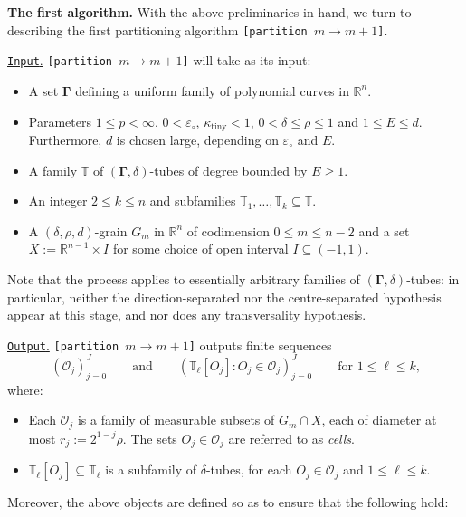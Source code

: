 \documentclass[reqno]{amsart}
\numberwithin{equation}{section}
\newcommand{\R}{\mathbb{R}}
\newcommand{\T}{\mathbb{T}}
\newcommand{\cO}{\mathcal{O}}
\newcommand{\bdGamma}{\boldsymbol{\Gamma}}
\theoremstyle{plain}
\theoremstyle{definition}
\newcommand{\ttiny}{\mathrm{tiny}}
\begin{document}




\noindent\textbf{The first algorithm.} With the above preliminaries in hand, we turn to describing the first partitioning algorithm \texttt{[partition $m \to m+1$]}.\medskip


\noindent\underline{\texttt{Input}.} \texttt{[partition $m \to m+1$]} will take as its input:
\begin{itemize}
     \item A set $\bdGamma$ defining a uniform family of polynomial curves in $\R^n$.
     \item Parameters $1 \leq p < \infty$, $0< \varepsilon_{\circ}$, $\kappa_{\ttiny} < 1$, $0<\delta \leq \rho \leq 1$ and $ 1 \leq E \leq d$. Furthermore, $d$ is chosen large, depending on $\varepsilon_{\circ}$ and $E$. 
    \item A family $\T$ of $(\bdGamma, \delta)$-tubes of degree bounded by $E \geq 1$.  
    \item An integer $2 \leq k \leq n$ and subfamilies $\T_1, \dots, \T_k \subseteq \T$.
    \item A $(\delta, \rho, d)$-grain $G_m$ in $\R^n$ of codimension $0 \leq m \leq n-2$ and a set $X := \R^{n-1} \times I$ for some choice of open interval $I \subseteq (-1,1)$.
\end{itemize}

Note that the process applies to essentially arbitrary families of $(\bdGamma, \delta)$-tubes: in particular, neither the direction-separated nor the centre-separated hypothesis appear at this stage, and nor does any transversality hypothesis.\medskip

%
%
%
\noindent\underline{\texttt{Output}.} \texttt{[partition $m \to m+1$]} outputs finite sequences 
\begin{equation*}
    (\cO_j)_{j=0}^J \qquad \textrm{and} \qquad (\T_{\ell}[O_j] : O_j \in \cO_j)_{j=0}^J \qquad \textrm{for $1 \leq \ell \leq k$,}
\end{equation*}
where:
\begin{itemize}
  \item Each $\cO_j$ is a family of measurable subsets of $G_m \cap X$, each of diameter at most $r_j := 2^{1-j}\rho$. The sets $O_j \in \cO_j$ are referred to as \emph{cells}.
\item $\T_{\ell}[O_j] \subseteq \T_{\ell}$ is a subfamily of $\delta$-tubes, for each $O_j \in \cO_j$ and $1 \leq \ell \leq k$. 
  \end{itemize}
Moreover, the above objects are defined so as to ensure that the following hold:\medskip
\end{document}
